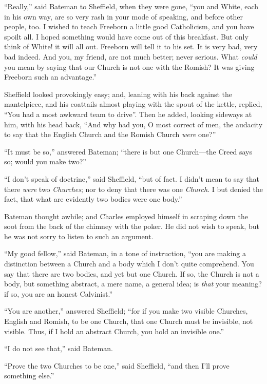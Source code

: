 ``Really,'' said Bateman to Sheffield, when they were gone,
``you and White, each in his own way, are so very rash in your
mode of speaking, and before other people, too. I wished to teach
Freeborn a little good Catholicism, and you have spoilt all. I hoped
something would have come out of this breakfast. But only think of
White! it will all out. Freeborn will tell it to his set. It is very
bad, very bad indeed. And you, my friend, are not much better; never
serious. What \emph{could} you mean by saying that our Church is
not one with the Romish? It was giving Freeborn such an
advantage.''

Sheffield looked provokingly easy; and, leaning with his back
against the mantelpiece, and his coattails almost playing with the
spout of the kettle, replied, ``You had a most awkward team to
drive''. Then he added, looking sideways at him, with his head
back, ``And why had you, O most correct of men, the audacity to
say that the English Church and the Romish Church \emph{were}
one?''

``It must be so,'' answered Bateman; ``there is but one
Church—the Creed says so; would you make two?''

``I don't speak of doctrine,'' said Sheffield, ``but of
fact. I didn't mean to say that there \emph{were} two \emph{Churches};
nor to deny that there was one \emph{Church}. I but denied the fact,
that what are evidently two bodies were one body.''

Bateman thought awhile; and Charles employed himself in scraping
down the soot from the back of the chimney with the poker. He did not
wish to speak, but he was not sorry to listen to such an argument.

``My good fellow,'' said Bateman, in a tone of instruction,
``you are making a distinction between a Church and a body which I
don't quite comprehend. You say that there are two bodies, and yet but
one Church. If so, the Church is not a body, but something abstract, a
mere name, a general idea; is \emph{that} your meaning? if so, you are
an honest Calvinist.''

``You are another,'' answered Sheffield; ``for if you
make two visible Churches, English and Romish, to be one Church,
that one Church must be invisible, not visible. Thus, if I hold an
abstract Church, you hold an invisible one.''

``I do not see that,'' said Bateman.

``Prove the two Churches to be one,'' said Sheffield,
``and then I'll prove something else.''

